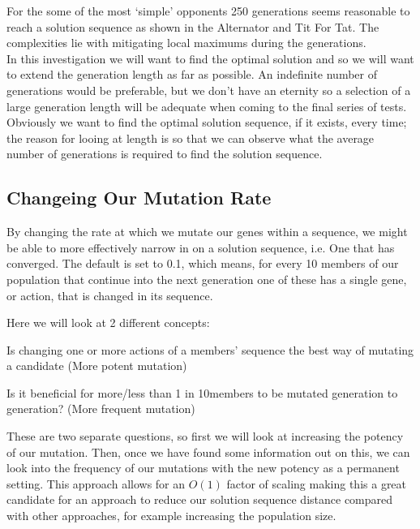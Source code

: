 For the some of the most `simple' opponents 250 generations seems reasonable to reach a solution sequence as shown in the Alternator and Tit For Tat. The complexities lie with mitigating local maximums during the generations.\\
    
In this investigation we will want to find the optimal solution and so we will want to extend the generation length as far as possible.
An indefinite number of generations would be preferable, but we don't have an eternity so a selection of a large generation length will be adequate when coming to the final series of tests.
Obviously we want to find the optimal solution sequence, if it exists, every time; the reason for looing at length is so that we can observe what the average number of generations is required to find the solution sequence.\\


\subsection{Changeing Our Mutation Rate}
 By changing the rate at which we mutate our genes within a sequence, we might be able to more effectively narrow in on a solution sequence, i.e. One that has converged. The default is set to 0.1, which means, for every 10 members of our population that continue into the next generation one of these has a single gene, or action, that is changed in its sequence. 
    
Here we will look at 2 different concepts:
\begin{itemize}
    \begin{item}
        Is changing one or more actions of a members' sequence the best way of mutating a candidate (More potent mutation)
    \end{item}
    \begin{item}
        Is it beneficial for more/less than 1 in 10members to be mutated generation to generation? (More frequent mutation)
    \end{item}
\end{itemize}
    
These are two separate questions, so first we will look at increasing the potency of our mutation. Then, once we have found some information out on this, we can look into the frequency of our mutations with the new potency as a permanent setting. This approach allows for an \(O(1)\) factor of scaling making this a great candidate for an approach to reduce our solution sequence distance compared with other approaches, for example increasing the population size.

